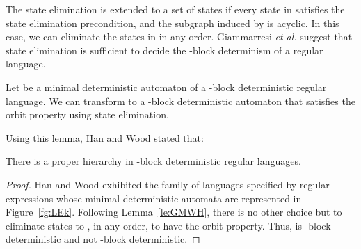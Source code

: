 \documentclass{llncs}
\begin{document}
	The state elimination is extended to a set  of states if every state in  satisfies the state elimination precondition, and the subgraph induced by  is acyclic. In this case, we can eliminate the states in  in any order. Giammarresi \emph{et al.} \cite{GMW01} suggest that state elimination is sufficient to decide the -block determinism of a regular language.

\begin{lemma}\label{le:GMWH}
	Let  be a minimal deterministic automaton of a -block deterministic regular language. We can transform  to a -block deterministic automaton that satisfies the orbit property using state elimination.
\end{lemma}

Using this lemma, Han and Wood stated that:

\begin{theorem}[\cite{HW08}]\label{th:HW}
	There is a proper hierarchy in -block deterministic regular languages.
\end{theorem}
\begin{proof}
	Han and Wood exhibited the family of languages  specified by regular expressions  whose minimal deterministic automata  are represented in Figure~\ref{fg:LEk}.
	Following Lemma~\ref{le:GMWH}, there is no other choice but to eliminate states  to , in any order, to have the orbit property.
	Thus,  is -block deterministic and not -block deterministic.
\end{proof}
\end{document}
